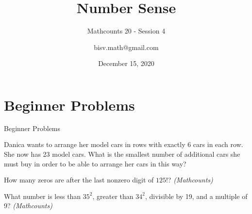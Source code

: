 \documentclass[9pt]{beamer}
\title{Number Sense}
\subtitle{Mathcounts 20 - Session 4}
\author{bisv.math@gmail.com}
\institute{BISV Mathcounts Club 20}
\date{December 15, 2020}
\begin{document}
\titlepage




\section{Beginner Problems}
\begin{frame}
    \begin{alertblock}{}
        \begin{flushright}
        {\huge Beginner Problems}
        \end{flushright}
    \end{alertblock}
\end{frame}

\begin{frame}[t]{7.1}
    \begin{block}{}
        Danica wants to arrange her model cars in rows with exactly
        6 cars in each row. She now has 23 model cars. What is the
        smallest number of additional cars she must buy in order to
        be able to arrange her cars in this way?
        
    \end{block}
    \end{frame}
    
    \begin{frame}[t]{7.2}
    \begin{block}{}
         How many zeros are after the last nonzero digit of $125!$? \textit{(Mathcounts)}
        
    \end{block}
    \end{frame}
    
    \begin{frame}[t]{7.3}
    \begin{block}{}
        What number is less than $35^2$, greater than $34^2$, divisible by 19, and a multiple of 9? \textit{(Mathcounts)}
         
    \end{block}
    \end{frame}
    
        
\end{document}
